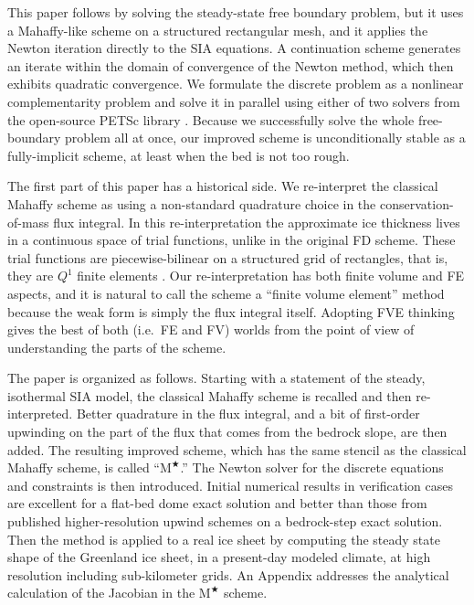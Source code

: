 \documentclass[review,letterpaper]{igs}
\newcommand{\Mstar}{$\text{M}^{\bigstar}$\xspace}
\begin{document}
This paper follows \cite{JouvetBueler2012} by solving the steady-state free boundary problem, but it uses a Mahaffy-like scheme on a structured rectangular mesh, and it applies the Newton iteration directly to the SIA equations.  A continuation scheme generates an iterate within the domain of convergence of the Newton method, which then exhibits quadratic convergence.  We formulate the discrete problem as a nonlinear complementarity problem \citep{BensonMunson2006} and solve it in parallel using either of two solvers from the open-source PETSc library \citep{Balayetal2014}.  Because we successfully solve the whole free-boundary problem all at once, our improved scheme is unconditionally stable as a fully-implicit scheme, at least when the bed is not too rough.

The first part of this paper has a historical side.  We re-interpret the classical Mahaffy scheme as using a non-standard quadrature choice in the conservation-of-mass flux integral.  In this re-interpretation the approximate ice thickness lives in a continuous space of trial functions, unlike in the original FD scheme.  These trial functions are piecewise-bilinear on a structured grid of rectangles, that is, they are $Q^1$ finite elements \citep{Elmanetal2005}.  Our re-interpretation has both finite volume \citep[FV;][]{LeVeque2002} and FE aspects, and it is natural to call the scheme a ``finite volume element'' method \citep[FVE;][]{Cai1990,EwingLinLin2002} because the weak form is simply the flux integral itself.  Adopting FVE thinking gives the best of both (i.e.~FE and FV) worlds from the point of view of understanding the parts of the scheme.

The paper is organized as follows.  Starting with a statement of the steady, isothermal SIA model, the classical Mahaffy scheme is recalled and then re-interpreted.  Better quadrature in the flux integral, and a bit of first-order upwinding on the part of the flux that comes from the bedrock slope, are then added.  The resulting improved scheme, which has the same stencil as the classical Mahaffy scheme, is called ``\Mstar.''  The Newton solver for the discrete equations and constraints is then introduced.  Initial numerical results in verification cases are excellent for a flat-bed dome exact solution and better than those from published higher-resolution upwind schemes on a bedrock-step exact solution.  Then the method is applied to a real ice sheet by computing the steady state shape of the Greenland ice sheet, in a present-day modeled climate, at high resolution including sub-kilometer grids.  An Appendix addresses the analytical calculation of the Jacobian in the \Mstar scheme.
\end{document}
